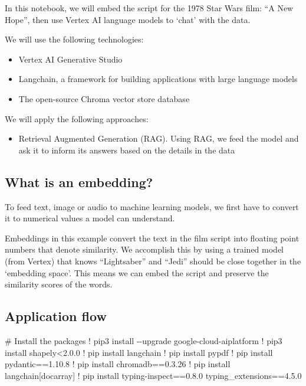 \documentclass[
  letterpaper,
  DIV=11,
  numbers=noendperiod]{scrreprt}
\newenvironment{Shaded}{\begin{snugshade}}{\end{snugshade}}
\newcommand{\CommentTok}[1]{\textcolor[rgb]{0.37,0.37,0.37}{#1}}
\newcommand{\FloatTok}[1]{\textcolor[rgb]{0.68,0.00,0.00}{#1}}
\newcommand{\NormalTok}[1]{\textcolor[rgb]{0.00,0.23,0.31}{#1}}
\newcommand{\OperatorTok}[1]{\textcolor[rgb]{0.37,0.37,0.37}{#1}}
\providecommand{\tightlist}{%
  \setlength{\itemsep}{0pt}\setlength{\parskip}{0pt}}\usepackage{longtable,booktabs,array}
\begin{document}
In this notebook, we will embed the script for the 1978 Star Wars film:
``A New Hope'', then use Vertex AI language models to `chat' with the
data.

We will use the following technologies:

\begin{itemize}
\item
  Vertex AI Generative Studio
\item
  Langchain, a framework for building applications with large language
  models
\item
  The open-source Chroma vector store database
\end{itemize}

We will apply the following approaches:

\begin{itemize}
\tightlist
\item
  Retrieval Augmented Generation (RAG). Using RAG, we feed the model and
  ask it to inform its answers based on the details in the data
\end{itemize}

\hypertarget{what-is-an-embedding}{%
\subsection{What is an embedding?}\label{what-is-an-embedding}}

To feed text, image or audio to machine learning models, we first have
to convert it to numerical values a model can understand.

Embeddings in this example convert the text in the film script into
floating point numbers that denote similarity. We accomplish this by
using a trained model (from Vertex) that knows ``Lightsaber'' and
``Jedi'' should be close together in the `embedding space'. This means
we can embed the script and preserve the similarity scores of the words.

\hypertarget{application-flow}{%
\subsection{Application flow}\label{application-flow}}

\begin{Shaded}
\begin{Highlighting}[]
\CommentTok{\# Install the packages}
\OperatorTok{!}\NormalTok{ pip3 install }\OperatorTok{{-}{-}}\NormalTok{upgrade google}\OperatorTok{{-}}\NormalTok{cloud}\OperatorTok{{-}}\NormalTok{aiplatform}
\OperatorTok{!}\NormalTok{ pip3 install shapely}\OperatorTok{\textless{}}\FloatTok{2.0.0}
\OperatorTok{!}\NormalTok{ pip install langchain}
\OperatorTok{!}\NormalTok{ pip install pypdf}
\OperatorTok{!}\NormalTok{ pip install pydantic}\OperatorTok{==}\FloatTok{1.10.8}
\OperatorTok{!}\NormalTok{ pip install chromadb}\OperatorTok{==}\FloatTok{0.3.26}
\OperatorTok{!}\NormalTok{ pip install langchain[docarray]}
\OperatorTok{!}\NormalTok{ pip install typing}\OperatorTok{{-}}\NormalTok{inspect}\OperatorTok{==}\FloatTok{0.8.0}\NormalTok{ typing\_extensions}\OperatorTok{==}\FloatTok{4.5.0}
\end{Highlighting}
\end{Shaded}
\end{document}
